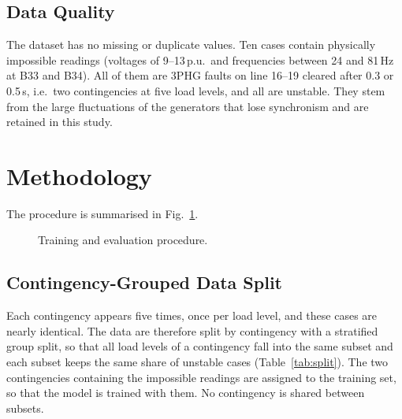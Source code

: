 \documentclass[conference]{IEEEtran}
\begin{document}
\subsection{Data Quality}
The dataset has no missing or duplicate values. Ten cases contain physically impossible readings (voltages of
9--13\,p.u.\ and frequencies between 24 and 81\,Hz at B33 and B34). All of them are 3PHG faults on line 16--19 cleared
after 0.3 or 0.5\,s, i.e.\ two contingencies at five load levels, and all are unstable. They stem from the large
fluctuations of the generators that lose synchronism and are retained in this study.

\section{Methodology}
\label{sec:method}
The procedure is summarised in Fig.~\ref{fig:flow}.

\begin{figure}[t]
\centering
{}
\caption{Training and evaluation procedure.}
\label{fig:flow}
\end{figure}

\subsection{Contingency-Grouped Data Split}
Each contingency appears five times, once per load level, and these cases are nearly identical. The data are therefore
split by contingency with a stratified group split, so that all load levels of a contingency fall into the same subset
and each subset keeps the same share of unstable cases (Table~\ref{tab:split}). The two contingencies containing the
impossible readings are assigned to the training set, so that the model is trained with them. No contingency is
shared between subsets.
\end{document}
